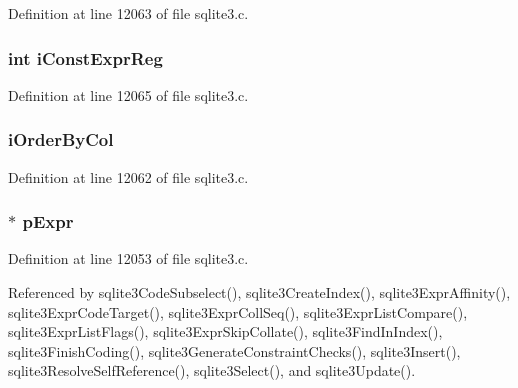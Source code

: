 Definition at line 12063 of file sqlite3.\+c.

\hypertarget{struct_expr_list_1_1_expr_list__item_a7a6cb52ea8d7946dbc9a8a7a6ed43d53}{}
\subsubsection[{i\+Const\+Expr\+Reg}]{\setlength{\rightskip}{0pt plus 5cm}int i\+Const\+Expr\+Reg}\label{struct_expr_list_1_1_expr_list__item_a7a6cb52ea8d7946dbc9a8a7a6ed43d53}


Definition at line 12065 of file sqlite3.\+c.

\hypertarget{struct_expr_list_1_1_expr_list__item_a4b8f02e23d9fc10b4ae35c2bfdbc13f2}{}
\subsubsection[{i\+Order\+By\+Col}]{ i\+Order\+By\+Col}\label{struct_expr_list_1_1_expr_list__item_a4b8f02e23d9fc10b4ae35c2bfdbc13f2}


Definition at line 12062 of file sqlite3.\+c.

\hypertarget{struct_expr_list_1_1_expr_list__item_aab4193f0accd02e4c2e5e60e105c03ca}{}
\subsubsection[{p\+Expr}]{$\ast$ p\+Expr}\label{struct_expr_list_1_1_expr_list__item_aab4193f0accd02e4c2e5e60e105c03ca}


Definition at line 12053 of file sqlite3.\+c.



Referenced by sqlite3\+Code\+Subselect(), sqlite3\+Create\+Index(), sqlite3\+Expr\+Affinity(), sqlite3\+Expr\+Code\+Target(), sqlite3\+Expr\+Coll\+Seq(), sqlite3\+Expr\+List\+Compare(), sqlite3\+Expr\+List\+Flags(), sqlite3\+Expr\+Skip\+Collate(), sqlite3\+Find\+In\+Index(), sqlite3\+Finish\+Coding(), sqlite3\+Generate\+Constraint\+Checks(), sqlite3\+Insert(), sqlite3\+Resolve\+Self\+Reference(), sqlite3\+Select(), and sqlite3\+Update().

